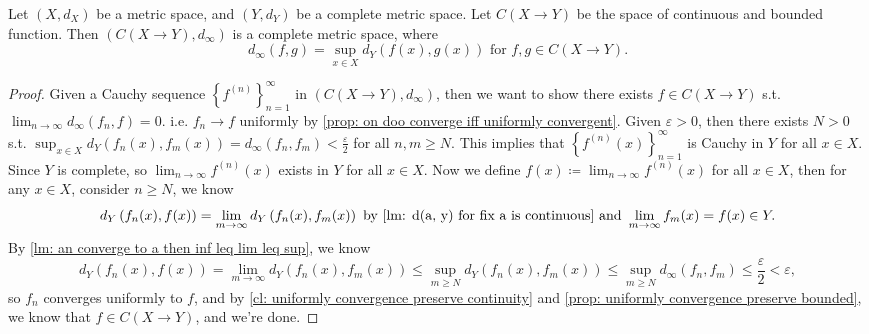 \begin{theorem}
    Let \((X, d_X)\) be a metric space, and \((Y, d_Y)\) be a complete metric space. Let \(C(X \to Y)\) be the space of continuous and bounded function. Then \(\left( C(X \to Y), d_\infty  \right) \) is a complete metric space, where 
    \[
        d_\infty (f, g) = \sup _{x \in X} d_Y (f(x), g(x)) \text{ for } f, g \in C(X \to Y).
    \]    
\end{theorem}
\begin{proof}
    Given a Cauchy sequence \(\left\{ f^{(n)} \right\}_{n=1}^{\infty}  \) in \(\left( C(X \to Y), d_\infty  \right) \), then we want to show there exists \(f \in C(X \to Y)\) s.t. \(\lim_{n \to \infty} d_\infty \left( f_n , f \right) = 0  \). i.e. \(f_n \to f\) uniformly by \autoref{prop: on doo converge iff uniformly convergent}. Given \(\varepsilon > 0\), then there exists \(N > 0\) s.t. \(\sup _{x \in X} d_Y (f_n(x), f_m(x)) = d_\infty (f_n, f_m) < \frac{\varepsilon}{2}\) for all \(n, m \ge N\). This implies that \(\left\{ f^{(n)}(x) \right\}_{n=1}^{\infty}  \) is Cauchy in \(Y\) for all \(x \in X\). Since \(Y\) is complete, so \(\lim_{n \to \infty} f^{(n)}(x) \) exists in \(Y\) for all \(x \in X\). Now we define \(f(x) \coloneqq \lim_{n \to \infty} f^{(n)}(x) \) for all \(x \in X\), then for any \(x \in X\), consider \(n \ge N\), we know 
    \[
        d_Y \left( f_n(x), f(x) \right) = \lim_{m \to \infty} d_Y \left( f_n(x), f_m(x)  \right) \text{ by \autoref{lm: d(a, y) for fix a is continuous} and } \lim_{m \to \infty} f_m(x) = f(x) \in Y.    
    \] 
    By \autoref{lm: an converge to a then inf leq lim leq sup}, we know 
    \[
        d_Y \left( f_n(x), f(x) \right) = \lim_{m \to \infty} d_Y \left( f_n(x), f_m(x) \right) \le \sup _{m \ge N} d_Y \left( f_n(x), f_m(x) \right) \le \sup _{m \ge N} d_\infty (f_n, f_m) \le \frac{\varepsilon}{2} < \varepsilon,    
    \] so \(f_n\) converges uniformly to \(f\), and by \autoref{cl: uniformly convergence preserve continuity} and \autoref{prop: uniformly convergence preserve bounded}, we know that \(f \in C(X \to Y)\), and we're done.                        
\end{proof}

